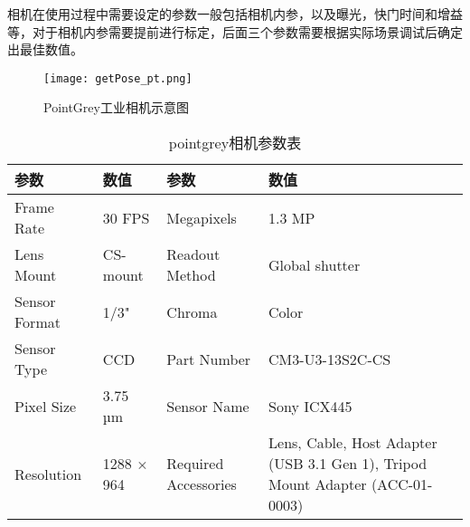 相机在使用过程中需要设定的参数一般包括相机内参，以及曝光，快门时间和增益等，对于相机内参需要提前进行标定，后面三个参数需要根据实际场景调试后确定出最佳数值。
\begin{figure}[H] %
  \centering
  \texttt{[image: getPose\_pt.png]}
  \caption{PointGrey工业相机示意图}
  \label{fig:getPose_pt}
\end{figure}

\begin{table}[h]
  \centering
  \caption{pointgrey相机参数表}
  \label{tab:pointgrey}
  \begin{tabular}{C{1.6cm}C{2.4cm}C{2.6cm}C{6.4cm}}
  \toprule
  \textbf{参数} & \textbf{数值} & \textbf{参数} & \textbf{数值} \\
  \midrule
  Frame Rate       & 30 FPS       & Megapixels      & 1.3 MP            \\
  Lens Mount       & CS-mount     & Readout Method  & Global shutter           \\
  Sensor Format    & 1/3"         & Chroma          & Color        \\
  Sensor Type      & CCD 	        & Part Number     & CM3-U3-13S2C-CS           \\
  Pixel Size       & 3.75 µm   	  & Sensor Name     & Sony ICX445      \\
  Resolution       & 1288 × 964	  & Required Accessories & Lens, Cable, Host Adapter (USB 3.1 Gen 1), Tripod Mount Adapter (ACC-01-0003)        \\

  \bottomrule
  \end{tabular}
\end{table}

